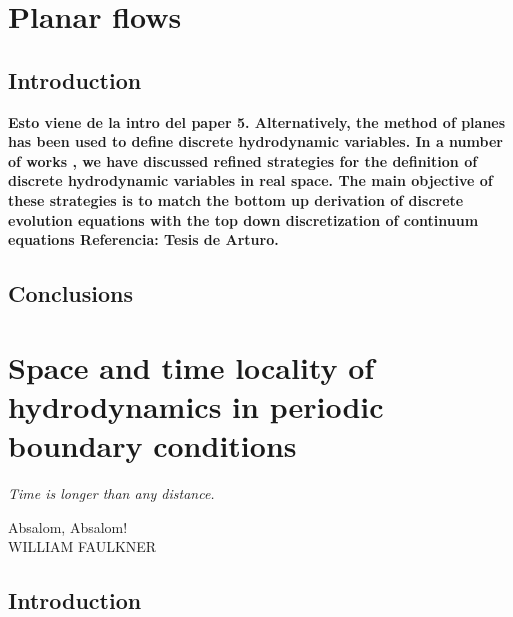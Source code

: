 \documentclass[a4paper,openright,12pt]{book}
\newcommand{\Note}[1]{{\bf \color{red}#1}}    %
\begin{document}
\chapter{Planar flows}\label{Chap:Planar}
\section{Introduction}

\Note{ Esto viene de la intro del paper 5. Alternatively,  the method  of planes  \cite{Davis1996,Travis2000} has
been used to  define discrete hydrodynamic variables.  In  a number of
works
\cite{Espanol2009i,DelaTorre2011,DelaTorre2015,EspanolDonev2015},   we
have  discussed  refined strategies  for  the  definition of  discrete
hydrodynamic variables  in real  space.  The  main objective  of these
strategies is to match the  bottom up derivation of discrete evolution
equations  with the  top  down discretization  of continuum  equations
Referencia: Tesis de Arturo.}


\section{Conclusions}

\chapter{Space and time locality of hydrodynamics in periodic boundary conditions}\label{Chap:PBC}
\epigraph{\textit{Time is longer than any distance.}}{Absalom, Absalom! \\ WILLIAM FAULKNER}
\section{Introduction}

%
\end{document}
